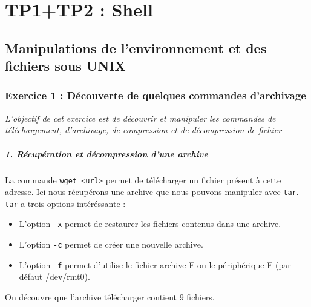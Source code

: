\chapter{TP1+TP2 : Shell}

\section{Manipulations de l’environnement et des fichiers sous UNIX}

\subsection{Exercice 1 : Découverte de quelques commandes d'archivage}
\textit{L'objectif de cet exercice est de découvrir et manipuler les commandes de téléchargement, d'archivage, de compression et de décompression de fichier}

\paragraph{1. Récupération et décompression d'une archive}
La commande \texttt{wget <url>} permet de télécharger un fichier présent à cette adresse. Ici nous récupérons une archive que nous pouvons manipuler avec \texttt{tar}. \texttt{tar} a trois options intéréssante :
\begin{itemize}
\item L'option \texttt{-x} permet de restaurer les fichiers contenus dans une archive.
\item L'option \texttt{-c} permet de créer une nouvelle archive.
\item L'option \texttt{-f} permet d'utilise le fichier archive F ou le périphérique F (par défaut /dev/rmt0).
\end{itemize}
On découvre que l'archive télécharger contient 9 fichiers.

